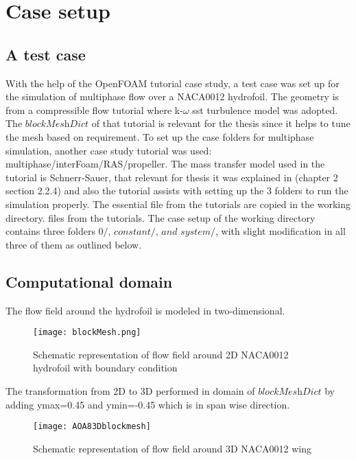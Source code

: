 \chapter{Case setup}
\section{A test case}
With the help of the OpenFOAM tutorial case study, a test case was set up
for the simulation of multiphase flow over a NACA0012 hydrofoil. The geometry is from a compressible flow tutorial 
where  k-$\omega$ sst turbulence model was adopted. The $\textit{blockMeshDict}$ of that tutorial is relevant for the thesis since it helps 
to tune the mesh based on requirement. To set up the case folders for multiphase simulation, another case study 
tutorial was used: multiphase/interFoam/RAS/propeller. The mass transfer model used in the tutorial is 
Schnerr-Sauer, that relevant for  thesis it was explained in (chapter 2 section 2.2.4) and also the tutorial assists with setting up 
the 3 folders to run the simulation properly. The essential file from the tutorials are copied in the working directory.
files from the tutorials. The case setup of the working directory contains three folders 
$\textit {0/, constant/, and system/}$, with slight modification  in all three 
of them as outlined below.
\section{Computational domain}
The flow field around the hydrofoil is modeled in two-dimensional.
\begin{figure}[H]
    \centering
    \texttt{[image: blockMesh.png]}
    \caption{Schematic representation of flow field around 2D NACA0012 hydrofoil with boundary condition}
    \label{fig:fig16}
\end{figure}
The transformation from 2D to 3D performed in domain of  $\textit{blockMeshDict}$ by adding ymax=0.45 and ymin=-0.45 which is in span wise direction.
\begin{figure}[H]
    \centering
    \texttt{[image: AOA83Dblockmesh]}
    \caption{Schematic representation of flow field around 3D NACA0012 wing }
    \label{fig:fig17}
\end{figure}
